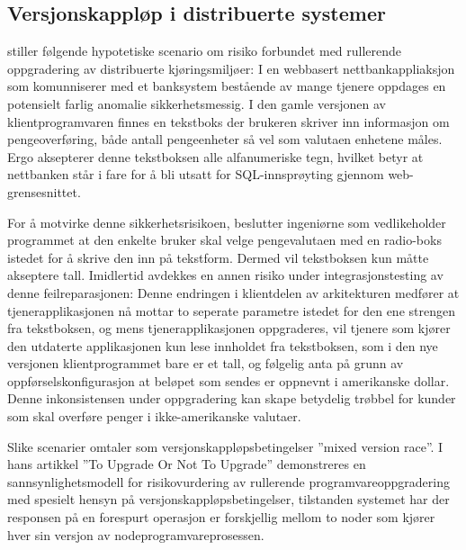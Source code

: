 \subsection{Versjonskappløp i distribuerte systemer}

\citep{dumitras2010upgrade} stiller følgende hypotetiske scenario om risiko forbundet med rullerende oppgradering av distribuerte kjøringsmiljøer: I en webbasert nettbankappliaksjon som komunniserer med et banksystem bestående av mange tjenere oppdages en potensielt farlig anomalie sikkerhetsmessig. I den gamle versjonen av klientprogramvaren finnes en tekstboks der brukeren skriver inn informasjon om pengeoverføring, både antall pengeenheter så vel som valutaen enhetene måles. Ergo aksepterer denne tekstboksen alle alfanumeriske tegn, hvilket betyr at nettbanken står i fare for å bli utsatt for SQL-innsprøyting gjennom web-grensesnittet.

For å motvirke denne sikkerhetsrisikoen, beslutter ingeniørne som vedlikeholder programmet at den enkelte bruker skal velge pengevalutaen med en radio-boks istedet for å skrive den inn på tekstform. Dermed vil tekstboksen kun måtte akseptere tall. Imidlertid avdekkes en annen risiko under integrasjonstesting av denne feilreparasjonen: Denne endringen i klientdelen av arkitekturen medfører at tjenerapplikasjonen nå mottar to seperate parametre istedet for den ene strengen fra tekstboksen, og mens tjenerapplikasjonen oppgraderes, vil tjenere som kjører den utdaterte applikasjonen kun lese innholdet fra tekstboksen, som i den nye versjonen klientprogrammet bare er et tall, og følgelig anta på grunn av oppførselskonfigurasjon at beløpet som sendes er oppnevnt i amerikanske dollar. Denne inkonsistensen under oppgradering kan skape betydelig trøbbel for kunder som skal overføre penger i ikke-amerikanske valutaer.

Slike scenarier omtaler \citep{dumitras2010upgrade} som versjonskappløpsbetingelser ''mixed version race''. I hans artikkel ''To Upgrade Or Not To Upgrade'' demonstreres en sannsynlighetsmodell for risikovurdering av rullerende programvareoppgradering med spesielt hensyn på versjonskappløpsbetingelser, tilstanden systemet har der responsen på en forespurt operasjon er forskjellig mellom to noder som kjører hver sin versjon av nodeprogramvareprosessen.
